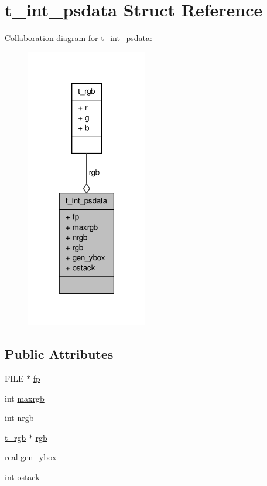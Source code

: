 \hypertarget{structt__int__psdata}{\section{t\-\_\-int\-\_\-psdata \-Struct \-Reference}
\label{structt__int__psdata}
}


\-Collaboration diagram for t\-\_\-int\-\_\-psdata\-:
\nopagebreak
\begin{figure}[H]
\begin{center}
\leavevmode
\includegraphics[width=150pt]{structt__int__psdata__coll__graph}
\end{center}
\end{figure}
\subsection*{\-Public \-Attributes}
\begin{DoxyCompactItemize}
\item 
\-F\-I\-L\-E $\ast$ \hyperlink{structt__int__psdata_a721deeef5b4b3ea353a130fcd3f75b23}{fp}
\item 
int \hyperlink{structt__int__psdata_aff2dd0eb6e65ee295c467b080add2ab1}{maxrgb}
\item 
int \hyperlink{structt__int__psdata_a7b319210b0a49cdbacfa04fa54cc2fd1}{nrgb}
\item 
\hyperlink{structt__rgb}{t\-\_\-rgb} $\ast$ \hyperlink{structt__int__psdata_a5b332b6cba5a0ba93dd29855b436d845}{rgb}
\item 
real \hyperlink{structt__int__psdata_ad8d5de42bdd642b16f28f3de1a23f2ff}{gen\-\_\-ybox}
\item 
int \hyperlink{structt__int__psdata_ad5a08740b4d8d6b7dc253234cec196f2}{ostack}
\end{DoxyCompactItemize}


